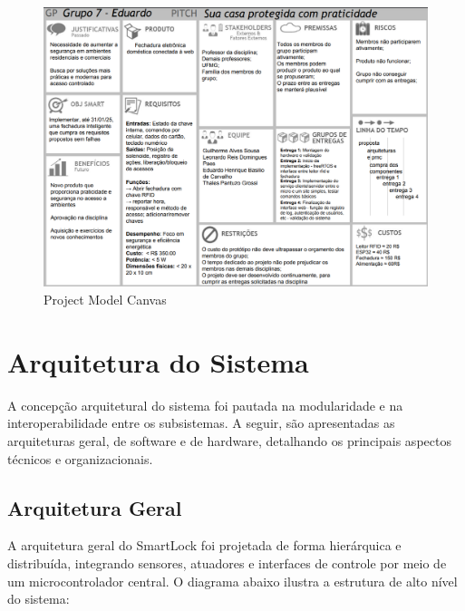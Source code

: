 \documentclass{article}
\begin{document}
\begin{figure}[H]
    \centering
    \includegraphics[width=\textwidth]{./images/pmc.png}
    \caption{Project Model Canvas}
    \label{fig:pmc}
\end{figure}

\section*{Arquitetura do Sistema}
A concepção arquitetural do sistema foi pautada na modularidade e na interoperabilidade entre os subsistemas. A seguir, são apresentadas as arquiteturas geral, de software e de hardware, detalhando os principais aspectos técnicos e organizacionais.

\subsection*{Arquitetura Geral}
A arquitetura geral do SmartLock foi projetada de forma hierárquica e distribuída, integrando sensores, atuadores e interfaces de controle por meio de um microcontrolador central. O diagrama abaixo ilustra a estrutura de alto nível do sistema:
\end{document}
